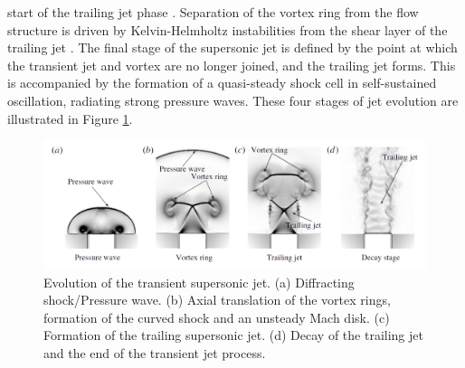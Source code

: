 start of the trailing jet phase \cite{gharib1998}. Separation of the vortex ring from the flow structure is driven by Kelvin-Helmholtz instabilities from the shear layer of the trailing jet \cite{zhao2000}. The final stage of the supersonic jet is defined by the point at which the transient jet and vortex are no longer joined, and the trailing jet forms. This is accompanied by the formation of a quasi-steady shock cell in self-sustained oscillation, radiating strong pressure waves. These four stages of jet evolution are illustrated in Figure \ref{fig:2}.
\begin{figure}[h] 
	\centering
	\includegraphics[scale=0.28]{fig2.png} 
	\caption{Evolution of the transient supersonic jet. (a) Diffracting shock/Pressure
		wave. (b) Axial translation of the vortex rings, formation of the curved shock and an unsteady Mach disk. (c) Formation of the trailing supersonic jet. (d) Decay of the trailing jet and the end of the transient jet
		process. \cite{fernández2017}}
	\label{fig:2}
\end{figure}

